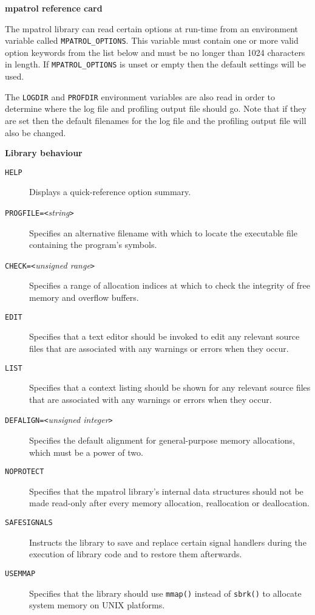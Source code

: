 \documentclass[a4paper,landscape,final]{article}
\newcommand{\heading}[1]{\textbf{\normalsize #1}}
\newcommand{\function}[1]{\texttt{#1()}}
\newcommand{\option}[1]{\texttt{#1}}
\newcommand{\optionpar}[2]{\option{#1}\texttt{=<}\textit{#2}\texttt{>}}
\begin{document}
\pagestyle{empty}

\footnotesize

\begin{multicols}{3}{\textbf{\Large mpatrol reference card}}

\vskip 12pt

The mpatrol library can read certain options at run-time from an environment
variable called \texttt{MPATROL\_OPTIONS}.  This variable must contain one or
more valid option keywords from the list below and must be no longer than 1024
characters in length.  If \texttt{MPATROL\_OPTIONS} is unset or empty then the
default settings will be used.

The \texttt{LOGDIR} and \texttt{PROFDIR} environment variables are also read in
order to determine where the log file and profiling output file should go.  Note
that if they are set then the default filenames for the log file and the
profiling output file will also be changed.

\vskip 12pt
\heading{Library behaviour}
\vskip 6pt

\begin{description}
\item[\option{HELP}]
Displays a quick-reference option summary.
\item[\optionpar{PROGFILE}{string}]
Specifies an alternative filename with which to locate the executable file
containing the program's symbols.
\item[\optionpar{CHECK}{unsigned range}]
Specifies a range of allocation indices at which to check the integrity of free
memory and overflow buffers.
\item[\option{EDIT}]
Specifies that a text editor should be invoked to edit any relevant source files
that are associated with any warnings or errors when they occur.
\item[\option{LIST}]
Specifies that a context listing should be shown for any relevant source files
that are associated with any warnings or errors when they occur.
\item[\optionpar{DEFALIGN}{unsigned integer}]
Specifies the default alignment for general-purpose memory allocations, which
must be a power of two.
\item[\option{NOPROTECT}]
Specifies that the mpatrol library's internal data structures should not be made
read-only after every memory allocation, reallocation or deallocation.
\item[\option{SAFESIGNALS}]
Instructs the library to save and replace certain signal handlers during the
execution of library code and to restore them afterwards.
\item[\option{USEMMAP}]
Specifies that the library should use \function{mmap} instead of \function{sbrk}
to allocate system memory on UNIX platforms.
\end{description}


\end{multicols}
\end{document}
